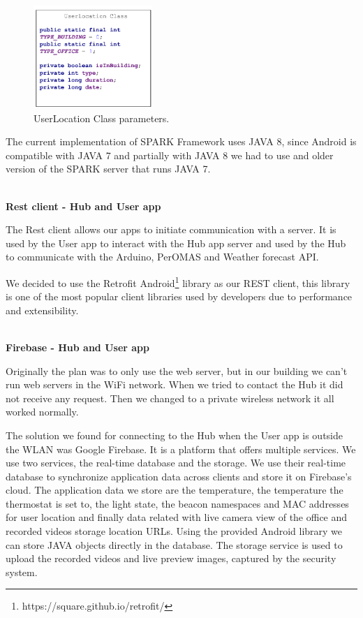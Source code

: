 \begin{figure}[h]
\centering
\includegraphics[width=0.4\textwidth]{Figures/userlocation_class}
\caption{UserLocation Class parameters.}
\label{user_location_class}
\end{figure}

The current implementation of SPARK Framework uses JAVA 8, since Android is compatible with JAVA 7 and partially with JAVA 8 we had to use and older version of the SPARK server that runs JAVA 7.  

\mbox{}\\
\textbf{Rest client - Hub and User app }

The Rest client allows our apps to initiate communication with a server. It is used by the User app to interact with the Hub app server and used by the Hub to communicate with the Arduino, PerOMAS and Weather forecast API.

We decided to use the Retrofit Android\footnote{https://square.github.io/retrofit/}  library as our \ac{REST} client, this library is one of the most popular client libraries used by developers due to performance and extensibility.



\mbox{}\\
\textbf{Firebase - Hub and User app}

Originally the plan was to only use the web server, but in our building we can't run web servers in the WiFi network. When we tried to contact the Hub it did not receive any request. Then we changed to a private wireless network it all worked normally.

The solution we found for connecting  to the Hub when the User app is outside the \ac{WLAN} was Google Firebase. It is a platform that offers multiple services. We use two services, the real-time database and the storage.
We use their real-time database to synchronize application data across clients and store it on Firebase's cloud. The application data we store are the temperature, the temperature the thermostat is set to, the light state, the beacon namespaces and MAC addresses for user location and finally data related with live camera view of the office and recorded videos storage location URLs. Using the provided Android library we can store JAVA objects directly in the database. The storage service is used to upload the recorded videos and live preview images, captured by the security system.

